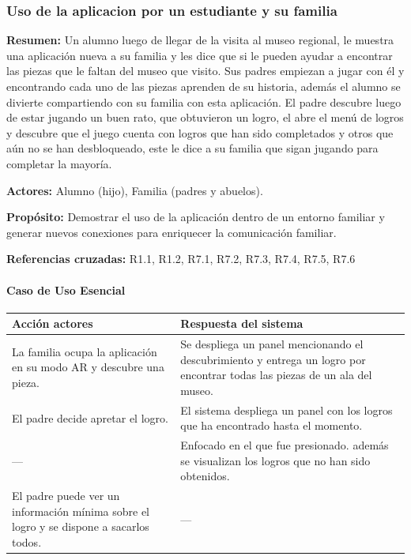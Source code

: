 \subsubsection{Uso de la aplicacion por un estudiante y su familia}

{\textbf {Resumen:}}
Un alumno luego de llegar de la visita al museo regional, le muestra una aplicación nueva a su familia y les dice que si le pueden ayudar a encontrar las piezas que le faltan del museo que visito. Sus padres empiezan a jugar con él y encontrando cada uno de las piezas aprenden de su historia, además el alumno se divierte compartiendo con su familia con esta aplicación. El padre descubre luego de estar jugando un buen rato, que obtuvieron un logro, el abre el menú de logros y descubre que el juego cuenta con logros que han sido completados y otros que aún no se han desbloqueado, este le dice a su familia que sigan jugando para completar la mayoría.

{\textbf {Actores:}}
Alumno (hijo), Familia (padres y abuelos).

{\textbf {Propósito:}}
Demostrar el uso de la aplicación dentro de un entorno familiar y generar nuevos conexiones para enriquecer la comunicación familiar.

{\textbf {Referencias cruzadas:}}
R1.1, R1.2, R7.1, R7.2, R7.3, R7.4, R7.5, R7.6

\paragraph{Caso de Uso Esencial}

\begin{longtable}{|p{5cm}|p{8cm}|}
\hline 
Acción actores & Respuesta del sistema \\ 
\hline 
La familia ocupa la aplicación en su modo AR y descubre una pieza. & Se despliega un panel mencionando el descubrimiento y entrega un logro por encontrar todas las piezas de un ala del museo. \\ 
\hline 
El padre decide apretar el logro. & El sistema despliega un panel con los logros que ha encontrado hasta el momento. \\ 
\hline
--- & Enfocado en el que fue presionado. además se visualizan los logros que no han sido obtenidos. \\ 
\hline
El padre puede ver un información mínima sobre el logro y se dispone a sacarlos todos. & --- \\ 
\hline
\end{longtable}

